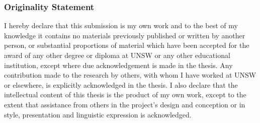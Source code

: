 %
%

\pagebreak
\vspace*{1in}
\noindent{}


\cleardoublepage
\vspace*{1in}
\subsubsection*{Originality Statement}

I hereby declare that this submission is my own work and to the best
of my knowledge it contains no materials previously published or written by
another person, or substantial proportions of material which have been accepted
for the award of any other degree or diploma at UNSW or any other educational
institution, except where due acknowledgement is made in the thesis. Any
contribution made to the research by others, with whom I have worked at UNSW or
elsewhere, is explicitly acknowledged in the thesis. I also declare that the
intellectual content of this thesis is the product of my own work, except to the
extent that assistance from others in the project's design and conception or in
style, presentation and linguistic expression is acknowledged.

